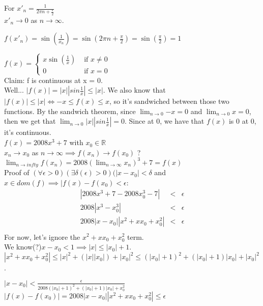 \documentclass[11pt]{article}
\begin{document}
		For ${x'_n} = \frac{1}{2\pi n + \frac{\pi}{2}}$\\
		$x'_n \to 0$ as $n \to \infty$. 

	  $f(x'_n) = \sin(\frac{1}{x_n}) = \sin(2\pi n + \frac{\pi}{2}) = \sin(\frac{\pi}{2}) = 1$

		$f(x) = \begin{cases} x\sin(\frac{1}{x}) & \text{ if } x \not= 0\\
						0 & \text{ if } x = 0\end{cases}$\\
		Claim: f is continuous at x = 0. \\
		Well... $|f(x)| = |x||sin\frac{1}{x}| 
		\le |x|$. We also know that $|f(x)| \le |x| \Leftrightarrow -x \le f(x) 
		\le x$, so it's sandwiched between those two functions. By the
		sandwich theorem, since $\lim_{n \to 0}{-x} = 0$ and $\lim_{n \to 0}{x} 
		= 0$, then we get that $\lim_{n \to 0}{|x||sin\frac{1}{x}|} = 0$. Since
		at 0, we have that $f(x)$ is 0 at 0, it's continuous.\\

		$f(x) = 2008x^3 + 7$ with $x_0 \in \mathbb{R}$ \\
		$x_n \to x_0$ as $n \to \infty \implies f(x_n) \to f(x_0)$ ? \\
		$\lim_{n \to infty}{f(x_n)} = 2008(\lim_{n \to \infty}{x_n})^3 + 7 = 
		f(x)$ \\
		
		Proof of 
		$(\forall \epsilon > 0)(\exists \delta(\epsilon) > 0)(|x - x_0| < \delta
		$ and $ x \in dom(f) \implies |f(x) - f(x_0) < \epsilon$:\\
		\begin{eqnarray*}
			|2008x^3 + 7 - 2008 x_0^3 - 7| &<& \epsilon\\
			2008|x^3 - x_0^3| &<& \epsilon\\
			2008|x - x_0||x^2 + xx_0 + x_0^2| &<& \epsilon\\
		\end{eqnarray*}
		For now, let's ignore the $x^2 + xx_0 + x_0^2$ term.\\
		We know(?)$x - x_0 < 1 \implies |x| \le |x_0| + 1$.\\
		$|x^2 + xx_0 + x_0^2| \le |x|^2 + (|x||x_0|) + |x_0|^2 \le 
		(|x_0| + 1)^2 + (|x_0| + 1)|x_0| + |x_0|^2 $. 

		$|x - x_0| < \frac{\epsilon}{2008(|x_0| + 1)^2 + (|x_0|+1)|x_0| + x_0^2}$\\
		$|f(x) - f(x_0)| = 2008|x - x_0||x^2 + xx_0 + x_0^2| \le \epsilon$\\
\end{document}

